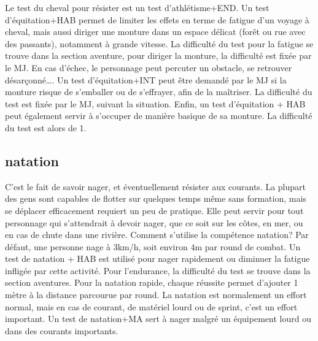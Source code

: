 \documentclass[10pt,a4paper,twocolumn]{book}
\begin{document}
Le test du cheval pour résister est un test d’athlétisme+END.
Un test d’équitation+HAB permet de limiter les effets en terme de fatigue d’un voyage à cheval, mais aussi diriger une monture dans un espace délicat (forêt ou rue avec des passants), notamment à grande vitesse. La difficulté du test pour la fatigue se trouve dans la section aventure, pour diriger la monture, la difficulté est fixée par le MJ. En cas d’échec, le personnage peut percuter un obstacle, se retrouver désarçonné….
Un test d’équitation+INT peut être demandé par le MJ si la monture risque de s’emballer ou de s’effrayer, afin de la maîtriser. La difficulté du test est fixée par le MJ, suivant la situation.
Enfin, un test d’équitation + HAB peut également servir à s’occuper de manière basique de sa monture. La difficulté du test est alors de 1.
\subsection*{natation}
C’est le fait de savoir nager, et éventuellement résister aux courants. La plupart des gens sont capables de flotter sur quelques temps même sans formation, mais se déplacer efficacement requiert un peu de pratique. Elle peut servir pour tout personnage qui s’attendrait à devoir nager, que ce soit sur les côtes, en mer, ou en cas de chute dans une rivière.
Comment s’utilise la compétence natation?
Par défaut, une personne nage à 3km/h, soit environ 4m par round de combat.
Un test de natation + HAB est utilisé pour nager rapidement ou diminuer la fatigue infligée par cette activité. Pour l’endurance, la difficulté du test se trouve dans la section aventures. Pour la natation rapide, chaque réussite permet d’ajouter 1 mètre à la distance parcourue par round. La natation est normalement un effort normal, mais en cas de courant, de matériel lourd ou de sprint, c’est un effort important.
Un test de natation+MA sert à nager malgré un équipement lourd ou dans des courants importants.
\end{document}

